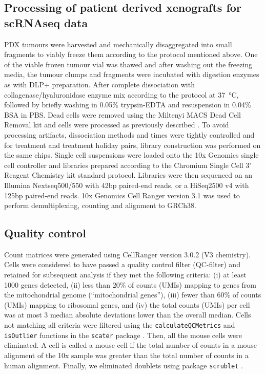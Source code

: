 \subsection{Processing of patient derived xenografts for scRNAseq data}
PDX tumours were harvested and mechanically disaggregated into small fragments to viably freeze them according to the protocol mentioned above. 
One of the viable frozen tumour vial was thawed and after washing out the freezing media, the tumour clumps and fragments were incubated with digestion enzymes as with DLP+ preparation. After complete dissociation with collagenase/hyaluronidase enzyme mix according to the protocol at \SI{37}{\degreeCelsius}, followed by briefly washing in 0.05\% trypsin-EDTA and resuspension in 0.04\% BSA in PBS. Dead cells were removed using the Miltenyi MACS Dead Cell Removal kit and cells were processed as previously described \cite{o2019dissociation}.
To avoid processing artifacts, dissociation methods and times were tightly controlled and for treatment and treatment holiday pairs, library construction was performed on the same chips. Single cell suspensions were loaded onto the 10x Genomics single cell controller and libraries prepared according to the Chromium Single Cell 3’ Reagent Chemistry kit standard protocol. 
Libraries were then sequenced on an Illumina Nextseq500/550 with 42bp paired-end reads, or a HiSeq2500 v4 with 125bp paired-end reads. 10x Genomics Cell Ranger version 3.1 was used to perform demultiplexing,  counting and alignment to GRCh38.

\subsection{Quality control}

Count matrices were generated using CellRanger version 3.0.2 (V3 chemistry). Cells were considered to have passed a quality control filter (QC-filter) and retained for subsequent analysis if they met the following criteria: (i) at least 1000 genes detected, (ii) less than 20\% of counts (UMIs) mapping to genes from the mitochondrial genome (``mitochondrial genes''), (iii) fewer than 60\% of counts (UMIs) mapping to ribosomal genes, and (iv) the total counts (UMIs) per cell was at most 3 median absolute deviations lower than the overall median. Cells not matching all criteria were filtered using the \texttt{calculateQCMetrics} and \texttt{isOutlier} functions in the \texttt{scater} package \cite{mccarthy2017scater}. Then, all the mouse cells were eliminated. A cell is called a mouse cell if the total number of counts in a mouse alignment of the 10x sample was greater than the total number of counts in a human alignment. Finally, we eliminated doublets using package \texttt{scrublet} \cite{scrublet}.

